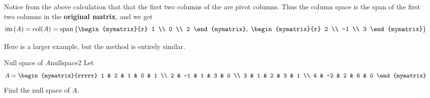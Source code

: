 \begin{solution}
Notice from the above calculation that that the first two columns of the {\rref} are pivot
columns. Thus the  column space is the span of the first two  columns in
the \textbf{original matrix}, and we get 
\begin{equation*}
\func{im}\tup{A} = \func{col}(A) =
\func{span} \set{\begin{mymatrix}{r}
1 \\ 
0 \\ 
2 
\end{mymatrix}, \; \begin{mymatrix}{r}
2 \\ 
-1 \\ 
3 
\end{mymatrix}  }
\end{equation*}

\end{solution}

Here is a larger example, but the method is entirely similar.

\begin{example}{Null space of $A$}{nullspace2}
Let
\begin{equation*}
A=\begin{mymatrix}{rrrrr}
1 & 2 & 1 & 0 & 1 \\
2 & -1 & 1 & 3 & 0 \\
3 & 1 & 2 & 3 & 1 \\
4 & -2 & 2 & 6 & 0
\end{mymatrix}
\end{equation*}
Find the null space of $A$.
\end{example}

